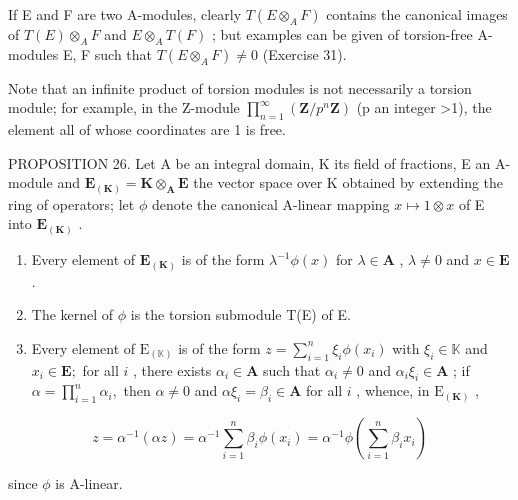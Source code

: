 If E and F are two A-modules, clearly \(T(E \otimes_{A} F)\) contains the canonical images of \(T(E) \otimes_{A} F\) and \(E \otimes_{A} T(F)\) ; but examples can be given of torsion-free A-modules E, F such that \(T(E \otimes_{A} F) \neq 0\) (Exercise 31).

Note that an infinite product of torsion modules is not necessarily a torsion module; for example, in the Z-module \(\prod_{n=1}^{\infty}\left(\mathbf{Z}/p^{n}\mathbf{Z}\right)\) (p an integer \textgreater1), the element all of whose coordinates are 1 is free.

PROPOSITION 26. Let A be an integral domain, K its field of fractions, E an A-module and \(\mathbf{E}_{(\mathbf{K})} = \mathbf{K} \otimes_{\mathbf{A}} \mathbf{E}\) the vector space over K obtained by extending the ring of operators; let \(\phi\) denote the canonical A-linear mapping \(x \mapsto 1 \otimes x\) of E into \(\mathbf{E}_{(\mathbf{K})}\) .

\begin{enumerate}
\def\labelenumi{(\roman{enumi})}
\item
  Every element of \(\mathbf{E}_{(\mathbf{K})}\) is of the form \(\lambda^{-1}\phi(x)\) for \(\lambda \in \mathbf{A}\) , \(\lambda \neq 0\) and \(x \in \mathbf{E}\) .
\item
  The kernel of \(\phi\) is the torsion submodule T(E) of E.
\item
  Every element of \(\mathrm{E}_{(\mathbb{K})}\) is of the form \(z = \sum_{i=1}^{n} \xi_i \phi(x_i)\) with \(\xi_i \in \mathbb{K}\) and \(x_{i}\in \mathbf{E};\) for all \(i\) , there exists \(\alpha_{i}\in \mathbf{A}\) such that \(\alpha_{i}\neq 0\) and \(\alpha_{i}\xi_{i}\in \mathbf{A}\) ; if \(\alpha = \prod_{i = 1}^{n}\alpha_{i},\) then \(\alpha \neq 0\) and \(\alpha \xi_{i} = \beta_{i}\in \mathbf{A}\) for all \(i\) , whence, in \(\mathrm{E}_{(\mathbf{K})}\) ,
\end{enumerate}

\[
z = \alpha^ {- 1} (\alpha z) = \alpha^ {- 1} \sum_ {i = 1} ^ {n} \beta_ {i} \phi (x _ {i}) = \alpha^ {- 1} \phi \left(\sum_ {i = 1} ^ {n} \beta_ {i} x _ {i}\right)
\]

since \(\phi\) is A-linear.

